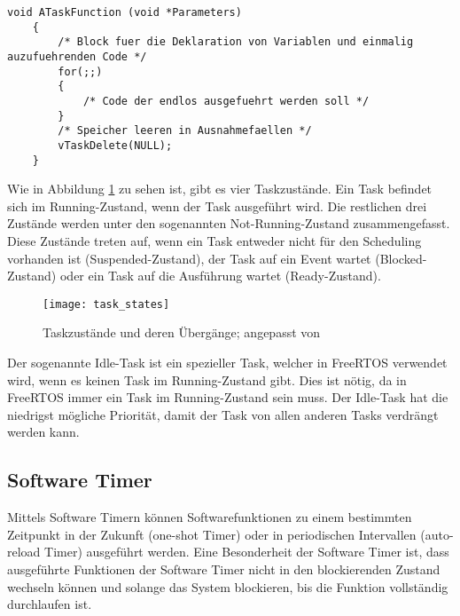 \begin{lstlisting}[caption={[Minimaler Aufbau eines Tasks]Minimaler Aufbau eines Tasks; angepasst von \cite[S.~47]{barryFreeRTOS}}, label={lst:minimalTask}, style=generalStyle]
    void ATaskFunction (void *Parameters)
    {
        /* Block fuer die Deklaration von Variablen und einmalig auzufuehrenden Code */
        for(;;)
        {
            /* Code der endlos ausgefuehrt werden soll */
        }
        /* Speicher leeren in Ausnahmefaellen */
        vTaskDelete(NULL);
    }
\end{lstlisting}

Wie in Abbildung \ref{fig:taskStates} zu sehen ist, gibt es vier Taskzustände. Ein Task befindet sich im Running-Zustand, wenn der Task ausgeführt wird. Die restlichen drei Zustände werden unter den sogenannten Not-Running-Zustand zusammengefasst. Diese Zustände treten auf, wenn ein Task entweder nicht für den Scheduling vorhanden ist (Suspended-Zustand), der Task auf ein Event wartet (Blocked-Zustand) oder ein Task auf die Ausführung wartet (Ready-Zustand). \cites[S.~55]{barryFreeRTOS}[S.~65f.]{barryFreeRTOS}

\begin{figure}[h]
    \centering
    \texttt{[image: task\_states]}
    \caption{Taskzustände und deren Übergänge; angepasst von \cite[S.~67]{barryFreeRTOS}}
    \label{fig:taskStates}
\end{figure}

Der sogenannte Idle-Task ist ein spezieller Task, welcher in FreeRTOS verwendet wird, wenn es keinen Task im Running-Zustand gibt. Dies ist nötig, da in FreeRTOS immer ein Task im Running-Zustand sein muss. Der Idle-Task hat die niedrigst mögliche Priorität, damit der Task von allen anderen Tasks verdrängt werden kann. \cite[S.~76]{barryFreeRTOS}

\subsection{Software Timer}
Mittels Software Timern können Softwarefunktionen zu einem bestimmten Zeitpunkt in der Zukunft (one-shot Timer) oder in periodischen Intervallen (auto-reload Timer) ausgeführt werden. Eine Besonderheit der Software Timer ist, dass ausgeführte Funktionen der Software Timer nicht in den blockierenden Zustand wechseln können und solange das System blockieren, bis die Funktion vollständig durchlaufen ist. \cites[S.~149]{barryFreeRTOS}[S.~151]{barryFreeRTOS}{freeRTOSTimer}

